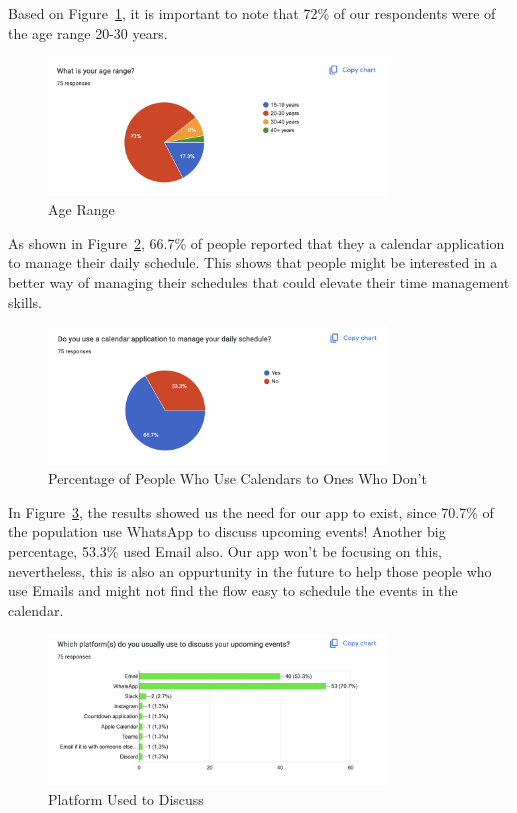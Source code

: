 \documentclass[12pt,a4paper]{report}
\begin{document}
Based on Figure~\ref{fig:age-range}, it is important to note that 72\% of our respondents were of the age range 20-30 years.

\begin{figure}[!h]
    \centering
    \includegraphics[width=0.8\textwidth]{images/survey/age.png}
    \caption{Age Range}
    \label{fig:age-range}
\end{figure}

As shown in Figure~\ref{fig:use-calendar}, 66.7\% of people reported that they a calendar application to manage their daily schedule. This shows that people might be interested in a better way of managing their schedules that could elevate their time management skills.

\begin{figure}[!h]
    \centering
    \includegraphics[width=0.8\textwidth]{images/survey/use-calendar.png}
    \caption{Percentage of People Who Use Calendars to Ones Who Don't}
    \label{fig:use-calendar}
\end{figure}

In Figure~\ref{fig:platform-to-discuss}, the results showed us the need for our app to exist, since 70.7\% of the population use WhatsApp to discuss upcoming events! Another big percentage, 53.3\% used Email also. Our app won't be focusing on this, nevertheless, this is also an oppurtunity in the future to help those people who use Emails and might not find the flow easy to schedule the events in the calendar.

\begin{figure}[!h]
    \centering
    \includegraphics[width=0.8\textwidth]{images/survey/platform-to-discuss.png}
    \caption{Platform Used to Discuss}
    \label{fig:platform-to-discuss}
\end{figure}
\end{document}
